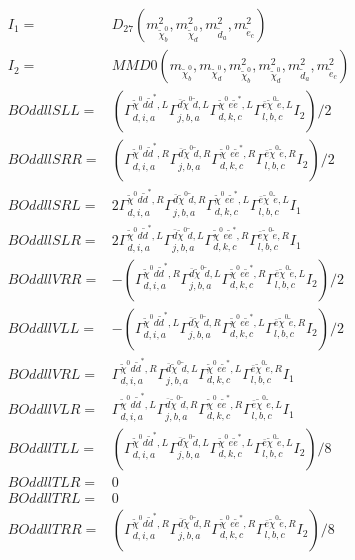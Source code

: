 \documentclass[A4,landscape]{article}
\begin{document}
\begin{align} 
I_1 = & D_{27}(m^2_{\tilde{\chi}^0_{{b}}}, m^2_{\tilde{\chi}^0_{{d}}}, m^2_{\tilde{d}_{{a}}}, m^2_{\tilde{e}_{{c}}}) \\ 
I_2 = & MMD0(m_{\tilde{\chi}^0_{{b}}}, m_{\tilde{\chi}^0_{{d}}}, m^2_{\tilde{\chi}^0_{{b}}}, m^2_{\tilde{\chi}^0_{{d}}}, m^2_{\tilde{d}_{{a}}}, m^2_{\tilde{e}_{{c}}}) \\ 
  BOddllSLL= & ( \Gamma^{\tilde{\chi}^0 d \tilde{d}^*,L}_{d, i, a} \Gamma^{\bar{d}\tilde{\chi}^0 \tilde{d} ,L}_{j, b, a} \Gamma^{\tilde{\chi}^0 e \tilde{e}^*,L}_{d, k, c} \Gamma^{\bar{e}\tilde{\chi}^0 \tilde{e} ,L}_{l, b, c} I_2)/2 \\ 
  BOddllSRR= & ( \Gamma^{\tilde{\chi}^0 d \tilde{d}^*,R}_{d, i, a} \Gamma^{\bar{d}\tilde{\chi}^0 \tilde{d} ,R}_{j, b, a} \Gamma^{\tilde{\chi}^0 e \tilde{e}^*,R}_{d, k, c} \Gamma^{\bar{e}\tilde{\chi}^0 \tilde{e} ,R}_{l, b, c} I_2)/2 \\ 
  BOddllSRL= & 2  \Gamma^{\tilde{\chi}^0 d \tilde{d}^*,R}_{d, i, a} \Gamma^{\bar{d}\tilde{\chi}^0 \tilde{d} ,R}_{j, b, a} \Gamma^{\tilde{\chi}^0 e \tilde{e}^*,L}_{d, k, c} \Gamma^{\bar{e}\tilde{\chi}^0 \tilde{e} ,L}_{l, b, c} I_1 \\ 
  BOddllSLR= & 2  \Gamma^{\tilde{\chi}^0 d \tilde{d}^*,L}_{d, i, a} \Gamma^{\bar{d}\tilde{\chi}^0 \tilde{d} ,L}_{j, b, a} \Gamma^{\tilde{\chi}^0 e \tilde{e}^*,R}_{d, k, c} \Gamma^{\bar{e}\tilde{\chi}^0 \tilde{e} ,R}_{l, b, c} I_1 \\ 
  BOddllVRR= & -( \Gamma^{\tilde{\chi}^0 d \tilde{d}^*,R}_{d, i, a} \Gamma^{\bar{d}\tilde{\chi}^0 \tilde{d} ,L}_{j, b, a} \Gamma^{\tilde{\chi}^0 e \tilde{e}^*,R}_{d, k, c} \Gamma^{\bar{e}\tilde{\chi}^0 \tilde{e} ,L}_{l, b, c} I_2)/2 \\ 
  BOddllVLL= & -( \Gamma^{\tilde{\chi}^0 d \tilde{d}^*,L}_{d, i, a} \Gamma^{\bar{d}\tilde{\chi}^0 \tilde{d} ,R}_{j, b, a} \Gamma^{\tilde{\chi}^0 e \tilde{e}^*,L}_{d, k, c} \Gamma^{\bar{e}\tilde{\chi}^0 \tilde{e} ,R}_{l, b, c} I_2)/2 \\ 
  BOddllVRL= &  \Gamma^{\tilde{\chi}^0 d \tilde{d}^*,R}_{d, i, a} \Gamma^{\bar{d}\tilde{\chi}^0 \tilde{d} ,L}_{j, b, a} \Gamma^{\tilde{\chi}^0 e \tilde{e}^*,L}_{d, k, c} \Gamma^{\bar{e}\tilde{\chi}^0 \tilde{e} ,R}_{l, b, c} I_1 \\ 
  BOddllVLR= &  \Gamma^{\tilde{\chi}^0 d \tilde{d}^*,L}_{d, i, a} \Gamma^{\bar{d}\tilde{\chi}^0 \tilde{d} ,R}_{j, b, a} \Gamma^{\tilde{\chi}^0 e \tilde{e}^*,R}_{d, k, c} \Gamma^{\bar{e}\tilde{\chi}^0 \tilde{e} ,L}_{l, b, c} I_1 \\ 
  BOddllTLL= & ( \Gamma^{\tilde{\chi}^0 d \tilde{d}^*,L}_{d, i, a} \Gamma^{\bar{d}\tilde{\chi}^0 \tilde{d} ,L}_{j, b, a} \Gamma^{\tilde{\chi}^0 e \tilde{e}^*,L}_{d, k, c} \Gamma^{\bar{e}\tilde{\chi}^0 \tilde{e} ,L}_{l, b, c} I_2)/8 \\ 
  BOddllTLR= & 0 \\ 
  BOddllTRL= & 0 \\ 
  BOddllTRR= & ( \Gamma^{\tilde{\chi}^0 d \tilde{d}^*,R}_{d, i, a} \Gamma^{\bar{d}\tilde{\chi}^0 \tilde{d} ,R}_{j, b, a} \Gamma^{\tilde{\chi}^0 e \tilde{e}^*,R}_{d, k, c} \Gamma^{\bar{e}\tilde{\chi}^0 \tilde{e} ,R}_{l, b, c} I_2)/8 \\ 
\end{align} 
\end{document}
